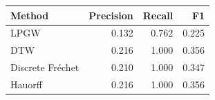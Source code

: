 \begin{tabular}{lrrr}
\toprule
Method & Precision & Recall & F1 \\
\midrule
LPGW & 0.132 & 0.762 & 0.225 \\
DTW & 0.216 & 1.000 & 0.356 \\
Discrete Fréchet & 0.210 & 1.000 & 0.347 \\
Hauorff & 0.216 & 1.000 & 0.356 \\
\bottomrule
\end{tabular}
